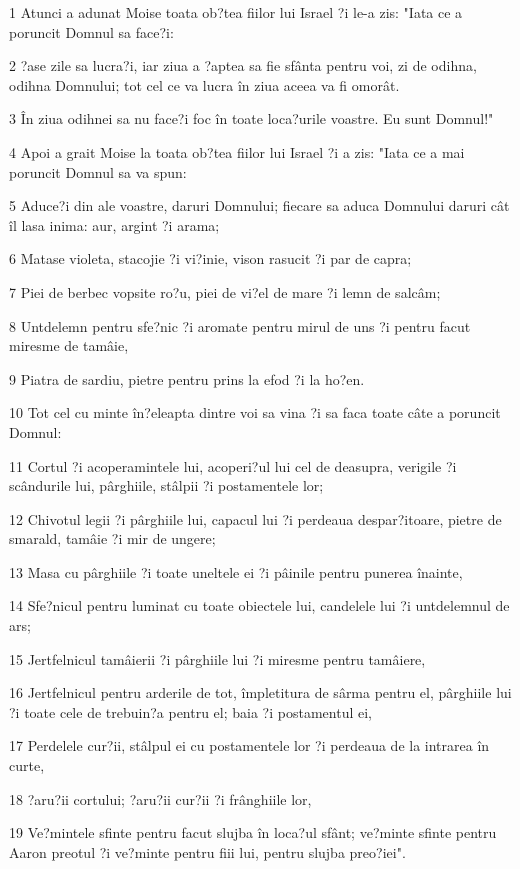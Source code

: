 \par 1 Atunci a adunat Moise toata ob?tea fiilor lui Israel ?i le-a zis: "Iata ce a poruncit Domnul sa face?i:
\par 2 ?ase zile sa lucra?i, iar ziua a ?aptea sa fie sfânta pentru voi, zi de odihna, odihna Domnului; tot cel ce va lucra în ziua aceea va fi omorât.
\par 3 În ziua odihnei sa nu face?i foc în toate loca?urile voastre. Eu sunt Domnul!"
\par 4 Apoi a grait Moise la toata ob?tea fiilor lui Israel ?i a zis: "Iata ce a mai poruncit Domnul sa va spun:
\par 5 Aduce?i din ale voastre, daruri Domnului; fiecare sa aduca Domnului daruri cât îl lasa inima: aur, argint ?i arama;
\par 6 Matase violeta, stacojie ?i vi?inie, vison rasucit ?i par de capra;
\par 7 Piei de berbec vopsite ro?u, piei de vi?el de mare ?i lemn de salcâm;
\par 8 Untdelemn pentru sfe?nic ?i aromate pentru mirul de uns ?i pentru facut miresme de tamâie,
\par 9 Piatra de sardiu, pietre pentru prins la efod ?i la ho?en.
\par 10 Tot cel cu minte în?eleapta dintre voi sa vina ?i sa faca toate câte a poruncit Domnul:
\par 11 Cortul ?i acoperamintele lui, acoperi?ul lui cel de deasupra, verigile ?i scândurile lui, pârghiile, stâlpii ?i postamentele lor;
\par 12 Chivotul legii ?i pârghiile lui, capacul lui ?i perdeaua despar?itoare, pietre de smarald, tamâie ?i mir de ungere;
\par 13 Masa cu pârghiile ?i toate uneltele ei ?i pâinile pentru punerea înainte,
\par 14 Sfe?nicul pentru luminat cu toate obiectele lui, candelele lui ?i untdelemnul de ars;
\par 15 Jertfelnicul tamâierii ?i pârghiile lui ?i miresme pentru tamâiere,
\par 16 Jertfelnicul pentru arderile de tot, împletitura de sârma pentru el, pârghiile lui ?i toate cele de trebuin?a pentru el; baia ?i postamentul ei,
\par 17 Perdelele cur?ii, stâlpul ei cu postamentele lor ?i perdeaua de la intrarea în curte,
\par 18 ?aru?ii cortului; ?aru?ii cur?ii ?i frânghiile lor,
\par 19 Ve?mintele sfinte pentru facut slujba în loca?ul sfânt; ve?minte sfinte pentru Aaron preotul ?i ve?minte pentru fiii lui, pentru slujba preo?iei".
